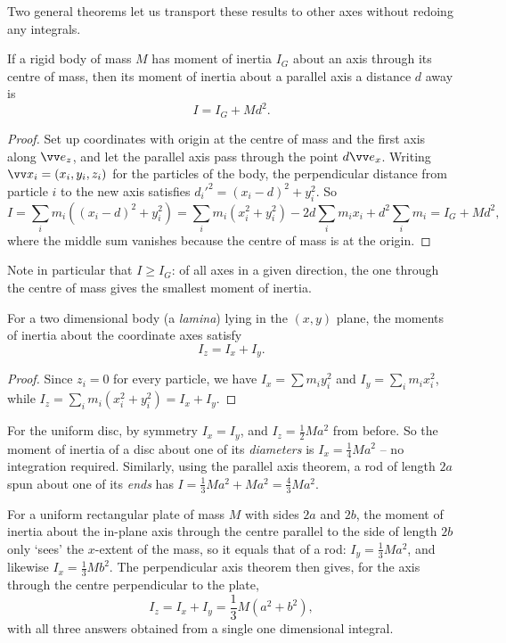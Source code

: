 Two general theorems let us transport these results to other axes without redoing any integrals.

\begin{theorem}
	If a rigid body of mass $M$ has moment of inertia $I_G$ about an axis through its centre of mass, then its moment of inertia about a parallel axis a distance $d$ away is
	$$
	I = I_G + Md^2.
	$$
\end{theorem}
\begin{proof}
	Set up coordinates with origin at the centre of mass and the first axis along $\vv e_z$, and let the parallel axis pass through the point $d \vv e_x$. Writing $\vv x_i = (x_i, y_i, z_i)$ for the particles of the body, the perpendicular distance from particle $i$ to the new axis satisfies $d_i'^2 = (x_i - d)^2 + y_i^2$. So
	$$
	I = \sum_i m_i \left((x_i - d)^2 + y_i^2\right) = \sum_i m_i (x_i^2 + y_i^2) - 2d \sum_i m_i x_i + d^2 \sum_i m_i = I_G + Md^2,
	$$
	where the middle sum vanishes because the centre of mass is at the origin.
\end{proof}

Note in particular that $I \geq I_G$: of all axes in a given direction, the one through the centre of mass gives the smallest moment of inertia.

\begin{theorem}
	For a two dimensional body (a \emph{lamina}) lying in the $(x,y)$ plane, the moments of inertia about the coordinate axes satisfy
	$$
	I_z = I_x + I_y.
	$$
\end{theorem}
\begin{proof}
	Since $z_i = 0$ for every particle, we have $I_x = \sum m_i y_i^2$ and $I_y = \sum_i m_i x_i^2$, while $I_z = \sum_i m_i (x_i^2 + y_i^2) = I_x + I_y$.
\end{proof}

\begin{example}
	For the uniform disc, by symmetry $I_x = I_y$, and $I_z = \frac{1}{2}Ma^2$ from before. So the moment of inertia of a disc about one of its \emph{diameters} is $I_x = \frac{1}{4}Ma^2$ -- no integration required. Similarly, using the parallel axis theorem, a rod of length $2a$ spun about one of its \emph{ends} has $I = \frac{1}{3}Ma^2 + Ma^2 = \frac{4}{3}Ma^2$.
\end{example}

\begin{example}
	For a uniform rectangular plate of mass $M$ with sides $2a$ and $2b$, the moment of inertia about the in-plane axis through the centre parallel to the side of length $2b$ only `sees' the $x$-extent of the mass, so it equals that of a rod: $I_y = \frac{1}{3}Ma^2$, and likewise $I_x = \frac{1}{3}Mb^2$. The perpendicular axis theorem then gives, for the axis through the centre perpendicular to the plate,
	$$
	I_z = I_x + I_y = \frac{1}{3}M(a^2 + b^2),
	$$
	with all three answers obtained from a single one dimensional integral.
\end{example}

